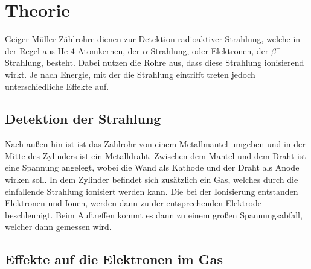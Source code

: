 \section{Theorie}
\label{sec:Theorie}

\noindent Geiger-Müller Zählrohre dienen zur Detektion radioaktiver Strahlung, welche in der Regel aus $\text{He-}4$ Atomkernen,
der $\alpha$-Strahlung, oder Elektronen, der $\beta^-$ Strahlung, besteht. Dabei nutzen die Rohre aus, dass diese 
Strahlung ionisierend wirkt. Je nach Energie, mit der die Strahlung eintrifft treten jedoch unterschiedliche Effekte auf.

\subsection{Detektion der Strahlung}

\noindent Nach außen hin ist ist das Zählrohr von einem Metallmantel umgeben und in der Mitte des Zylinders ist ein Metalldraht.
Zwischen dem Mantel und dem Draht ist eine Spannung angelegt, wobei die Wand als Kathode und der Draht als Anode
wirken soll. In dem Zylinder befindet sich zusätzlich ein Gas, welches durch die einfallende Strahlung ionisiert
werden kann. Die bei der Ionisierung entstanden Elektronen und Ionen, werden dann zu der entsprechenden Elektrode
beschleunigt. Beim Auftreffen kommt es dann zu einem großen Spannungsabfall, welcher dann gemessen wird.

\subsection{Effekte auf die Elektronen im Gas}

